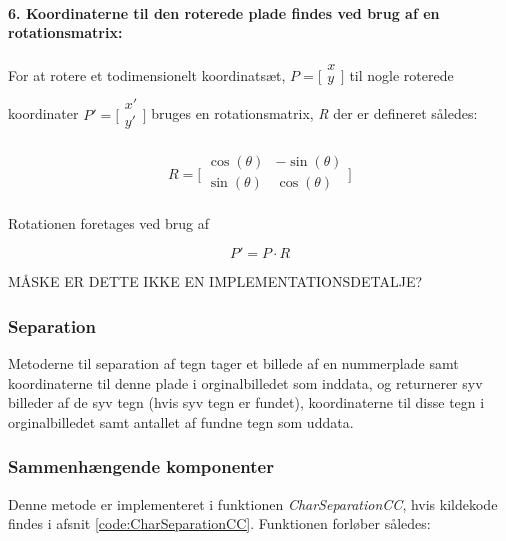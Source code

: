 \paragraph{6. Koordinaterne til den roterede plade findes ved brug af en rotationsmatrix:} For at rotere et todimensionelt koordinatsæt, $P=\biggl[\begin{array}{c} x\\ y\\ \end{array}\biggr]$ til nogle roterede koordinater $P'=\biggl[\begin{array}{c} x'\\ y'\\ \end{array}\biggr]$ bruges en rotationsmatrix, \textit{R} der er defineret således:

\begin{displaymath} 
R = 
\biggl[ \begin{array}{cc} 
\cos(\theta) & - \sin(\theta) \\
\sin(\theta) & \cos(\theta) \\
\end{array} \biggr] 
\end{displaymath}

Rotationen foretages ved brug af

\begin{displaymath}
P' = P \cdot R
\end{displaymath}

MÅSKE ER DETTE IKKE EN IMPLEMENTATIONSDETALJE?

\subsubsection{Separation}

Metoderne til separation af tegn tager et billede af en nummerplade samt koordinaterne til denne plade i orginalbilledet som inddata, og returnerer syv billeder af de syv tegn (hvis syv tegn er fundet), koordinaterne til disse tegn i orginalbilledet samt antallet af fundne tegn som uddata.

\subsubsection*{Sammenhængende komponenter}

Denne metode er implementeret i funktionen \textit{CharSeparationCC}, hvis kildekode findes i afsnit \vref{code:CharSeparationCC}. Funktionen forløber således:

